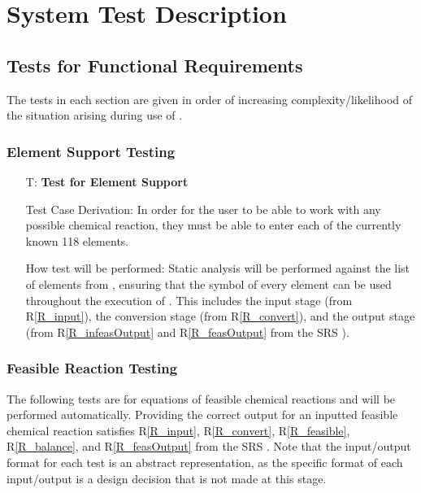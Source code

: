 \documentclass[12pt, titlepage]{article}
\newcounter{testnum} %
\newcommand{\rref}[1]{R\ref{#1}}
\begin{document}
\section{System Test Description} \label{sec_sys_tests}

\subsection{Tests for Functional Requirements} \label{sec_sysFunReqs}

The tests in each section are given in order of increasing
complexity/likelihood of the situation arising during use of \progname{}.

\subsubsection{Element Support Testing}

\begin{enumerate}

  \item[T\refstepcounter{testnum}\thetestnum \label{test_element_support}:]
    \textbf{Test for Element Support}

    Test Case Derivation: In order for the user to be able to work with any
    possible chemical reaction, they must be able to enter each of the
    currently known 118 elements.

    How test will be performed: Static analysis will be performed against the
    list of elements from \cite{wikipedia_list_2023}, ensuring that the
    symbol of every element can be used throughout the execution of
    \progname{}. This includes the input stage (from \rref{R_input}), the
    conversion stage (from \rref{R_convert}), and the output stage (from
    \rref{R_infeasOutput} and \rref{R_feasOutput} from the SRS \cite{srs}).

\end{enumerate}

\subsubsection{Feasible Reaction Testing}

The following tests are for equations of feasible chemical reactions and
will be performed automatically. Providing the correct output for an inputted
feasible chemical reaction satisfies \rref{R_input}, \rref{R_convert},
\rref{R_feasible}, \rref{R_balance}, and \rref{R_feasOutput} from the SRS
\cite{srs}. Note that the input/output format
for each test is an abstract representation, as the specific format of each
input/output is a design decision that is not made at this stage.
\end{document}
